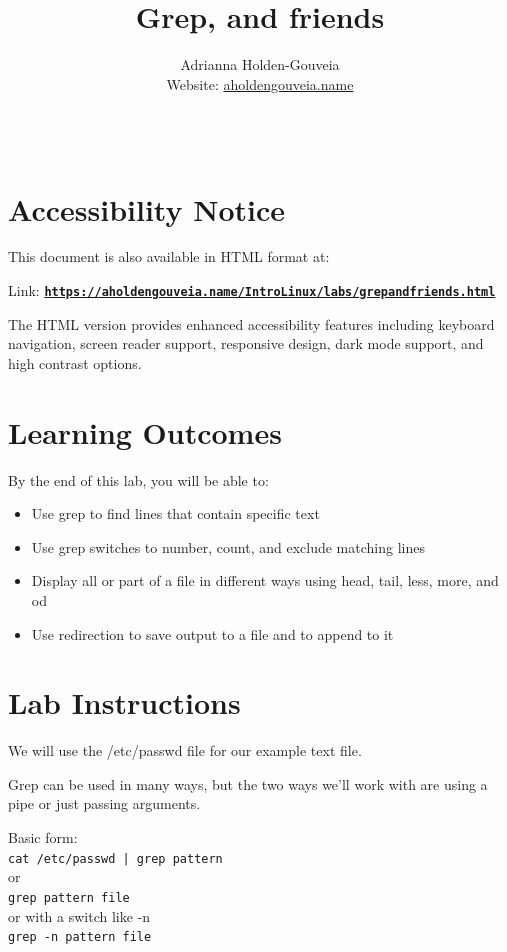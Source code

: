 \documentclass[12pt]{article}
\title{Grep, and friends}
\author{
        Adrianna Holden-Gouveia \\
        Website: \href{https://aholdengouveia.name}{aholdengouveia.name}\\ 
        \date{\vspace{-5ex}}
        \faGithub {: aholdengouveia} \\
        }
\begin{document}
    

\maketitle

\section*{Accessibility Notice}
This document is also available in HTML format at:

Link: \href{https://aholdengouveia.name/IntroLinux/labs/grepandfriends.html}{\textbf{\nolinkurl{https://aholdengouveia.name/IntroLinux/labs/grepandfriends.html}}}

The HTML version provides enhanced accessibility features including keyboard navigation, screen reader support, responsive design, dark mode support, and high contrast options.



\section*{Learning Outcomes}
By the end of this lab, you will be able to:
\begin{itemize}
    \item Use grep to find lines that contain specific text
    \item Use grep switches to number, count, and exclude matching lines
    \item Display all or part of a file in different ways using head, tail, less, more, and od
    \item Use redirection to save output to a file and to append to it
\end{itemize}
\section*{Lab Instructions}


We will use the /etc/passwd file for our example text file.


Grep can be used in many ways, but the two ways we'll work with are using a pipe or just passing arguments.

Basic form: \\
  \verb!cat /etc/passwd | grep pattern! \\
  or \\
  \verb|grep pattern file| \\
  or with a switch like -n \\
  \verb|grep -n pattern file|  
\end{document}
